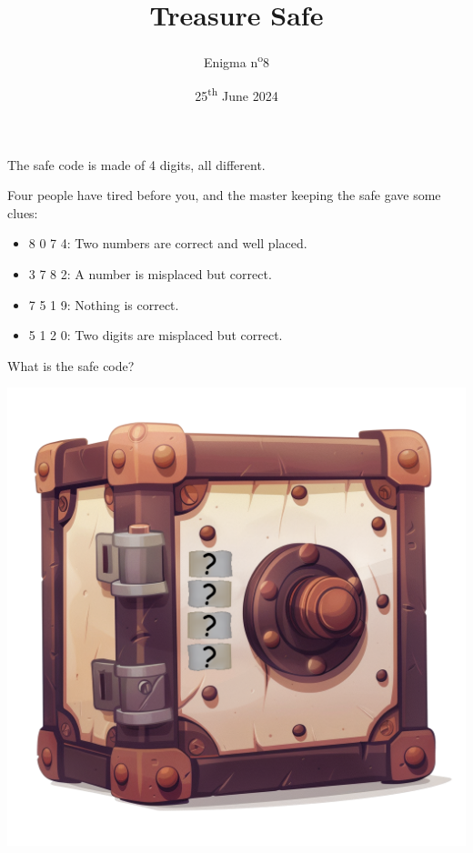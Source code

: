 \documentclass[a4paper, top=10mm]{article}
\title{\textbf{\huge{Treasure Safe}}}
\author{Enigma n\textsuperscript{o}8}
\date{25\textsuperscript{th} June 2024}
\begin{document}
	\maketitle
	
	\Large
	The safe code is made of 4 digits, all different.
	
	Four people have tired before you, and the master keeping the safe gave some clues:
	\begin{itemize}
		\item 8 0 7 4: Two numbers are correct and well placed.
		\item 3 7 8 2: A number is misplaced but correct.
		\item 7 5 1 9: Nothing is correct.
		\item 5 1 2 0: Two digits are misplaced but correct.
	\end{itemize}
	
	What is the safe code?
	
	\vspace{2cm}
	
	\begin{center}
		\includegraphics[width=\linewidth]{08safe.png}
	\end{center}
	

	
	
\end{document}
